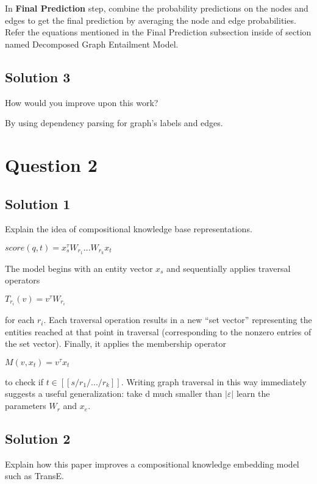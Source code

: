 \documentclass[12pt,leqno,a4paper]{article}
\begin{document}
In \textbf{Final Prediction} step, combine the probability predictions on the nodes and edges to get the final prediction by averaging the node
and edge probabilities. Refer the equations mentioned in the Final Prediction subsection inside of section named Decomposed Graph Entailment Model. 



\subsection{Solution 3}
How would you improve upon this work?
\newline

By using dependency parsing for graph's labels and edges. 

\section{Question 2}

\subsection{Solution 1}
Explain the idea of compositional knowledge base representations.
\newline

$score(q,t) = x_{s}^{\tau}W_{r_1}...W_{r_k}x_t $
\newline

The model begins with an entity vector $x_s$  and sequentially
applies traversal operators 

$T_{r_i}(v)= v^{\tau} W_{r_i}$ 

for each $r_i$. Each traversal operation results in a new “set vector” representing the entities reached
at that point in traversal (corresponding to the
nonzero entries of the set vector). Finally, it applies the membership operator 

$M(v,x_t) = v^{\tau} x_t$ 

to check if $t \in [[s/r_{1}/.../r_{k}]]$. Writing graph
traversal in this way immediately suggests a useful
generalization: take d much smaller than $|\varepsilon|$ learn the parameters $W_r$ and $x_e$.

\subsection{Solution 2}
Explain how this paper improves a compositional knowledge embedding
model such as TransE.
\newline
\end{document}
